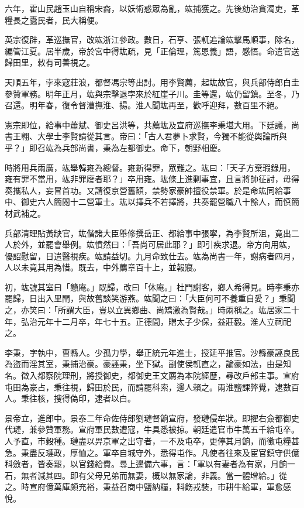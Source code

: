 \begin{pinyinscope}
六年，霍山民趙玉山自稱宋裔，以妖術惑眾為亂，竑捕獲之。先後劾治貪濁吏，革糧長之蠹民者，民大稱便。

英宗復辟，革巡撫官，改竑浙江參政。數日，石亨、張軏追論竑擊馬順事，除名，編管江夏。居半歲，帝於宮中得竑疏，見「正倫理，篤恩義」語，感悟。命遣官送歸田里，敕有司善視之。

天順五年，孛來寇莊浪，都督馮宗等出討。用李賢薦，起竑故官，與兵部侍郎白圭參贊軍務。明年正月，竑與宗擊退孛來於紅崖子川。圭等還，竑仍留鎮。至冬，乃召還。明年春，復令督漕撫淮、揚。淮人聞竑再至，歡呼迎拜，數百里不絕。

憲宗即位，給事中蕭斌、御史呂洪等，共薦竑及宣府巡撫李秉堪大用。下廷議，尚書王翱、大學士李賢請從其言。帝曰：「古人君夢卜求賢，今獨不能從輿論所與乎？」即召竑為兵部尚書，秉為左都御史。命下，朝野相慶。

時將用兵兩廣，竑舉韓雍為總督。雍新得罪，眾難之。竑曰：「天子方棄瑕錄用，雍有罪不當用，竑非罪廢者耶？」卒用雍。竑條上進剿事宜，且言將帥征討，毋得奏攜私人，妄冒首功。又請復京營舊額，禁勢家豪帥擅役禁軍。於是命竑同給事中、御史六人簡閱十二營軍士。竑以擇兵不若擇將，共奏罷營職八十餘人，而慎簡材武補之。

兵部清理貼黃缺官，竑偕諸大臣舉修撰岳正、都給事中張寧，為李賢所沮，竟出二人於外，並罷會舉例。竑憤然曰：「吾尚可居此耶？」即引疾求退。帝方向用竑，優詔慰留，日遣醫視疾。竑請益切。九月命致仕去。竑為尚書一年，謝病者四月，人以未竟其用為惜。既去，中外薦章百十上，並報寢。

初，竑號其室曰「戇庵。」既歸，改曰「休庵。」杜門謝客，鄉人希得見。時李秉亦罷歸，日出入里閈，與故舊談笑游燕。竑聞之曰：「大臣何可不養重自愛？」秉聞之，亦笑曰：「所謂大臣，豈以立異鄉曲、尚矯激為賢哉。」時兩稱之。竑居家二十年，弘治元年十二月卒，年七十五。正德間，贈太子少保，益莊毅。淮人立祠祀之。

李秉，字執中，曹縣人。少孤力學，舉正統元年進士，授延平推官。沙縣豪誣良民為盜而淫其室，秉捕治豪。豪誣秉，坐下獄。副使侯軏直之，論豪如法，由是知名。徵入都察院理刑，將授御史，都御史王文薦為本院經歷，尋改戶部主事。宣府屯田為豪占，秉往視，歸田於民，而請罷科索，邊人賴之。兩淮鹽課弊覺，逮數百人。秉往核，搜得偽印，逮者以白。

景帝立，進郎中。景泰二年命佐侍郎劉璉督餉宣府，發璉侵牟狀。即擢右僉都御史代璉，兼參贊軍務。宣府軍民數遭寇，牛具悉被掠。朝廷遣官市牛萬五千給屯卒。人予直，市穀種。璉盡以畀京軍之出守者，一不及屯卒，更停其月餉，而徵屯糧甚急。秉盡反璉政，厚恤之。軍卒自城守外，悉得屯作。凡使者往來及宦官鎮守供億科斂者，皆奏罷，以官錢給費。尋上邊備六事，言：「軍以有妻者為有家，月餉一石，無者減其四。即有父母兄弟而無妻，概以無家論，非義。當一體增給。」從之。時宣府億萬庫頗充裕，秉益召商中鹽納糧，料飭戎裝，市耕牛給軍，軍愈感悅。


\end{pinyinscope}
